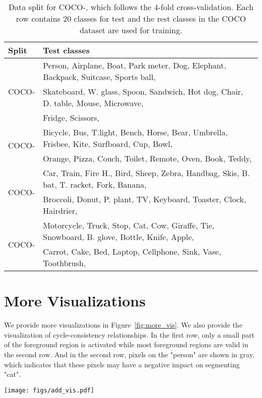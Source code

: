 \documentclass{article}
\begin{document}
\begin{table}[ht]
\centering
\small
\begin{tabular}{l|l}
\toprule[1pt]
Split & Test classes \\ \hline
\multirow{3}{*}{COCO-} & Person, Airplane, Boat, Park meter, Dog, Elephant, Backpack, Suitcase, Sports ball,  \\
& Skateboard, W. glass, Spoon, Sandwich, Hot dog, Chair, D. table, Mouse, Microwave, \\
& Fridge, Scissors,  \\ \hline
\multirow{2}{*}{COCO-} & Bicycle, Bus, T.light, Bench, Horse, Bear, Umbrella, Frisbee, Kite, Surfboard, Cup, Bowl, \\
& Orange, Pizza, Couch, Toilet, Remote, Oven, Book, Teddy,  \\ \hline
\multirow{2}{*}{COCO-} & Car, Train, Fire H., Bird, Sheep, Zebra, Handbag, Skis, B. bat, T. racket, Fork, Banana, \\
& Broccoli, Donut, P. plant, TV, Keyboard, Toaster, Clock, Hairdrier,  \\ \hline
\multirow{2}{*}{COCO-} & Motorcycle, Truck, Stop, Cat, Cow, Giraffe, Tie, Snowboard, B. glove, Bottle, Knife, Apple, \\
& Carrot, Cake, Bed, Laptop, Cellphone, Sink, Vase, Toothbrush, \\
\bottomrule[1pt]
\end{tabular}
\caption{Data split for COCO-, which follows the 4-fold cross-validation. Each row contains 20 classes for test and the rest classes in the COCO dataset are used for training.}
\label{tab:cocosplit}
\end{table}

\section{More Visualizations}
We provide more visualizations in Figure~\ref{fig:more_vis}. We also provide the visualization of cycle-consistency relationships. In the first row, only a small part of the foreground region is activated while most foreground regions are valid in the second row. And in the second row, pixels on the "person" are shown in gray, which indicates that these pixels may have a negative impact on segmenting "cat".

\begin{figure*}[ht]
    \centering
    \texttt{[image: figs/add\_vis.pdf]}
    \caption{More Qualitative results on Pascal-. The cycle-consistency is visualized in the  column, in which red points are cycle-consistent foreground pixels, blue points are cycle-consistent background pixels, and gray points are cycle-inconsistent pixels. Best viewed in color and with zoom-in. }
    \label{fig:more_vis}
\end{figure*}


 
\end{document}
